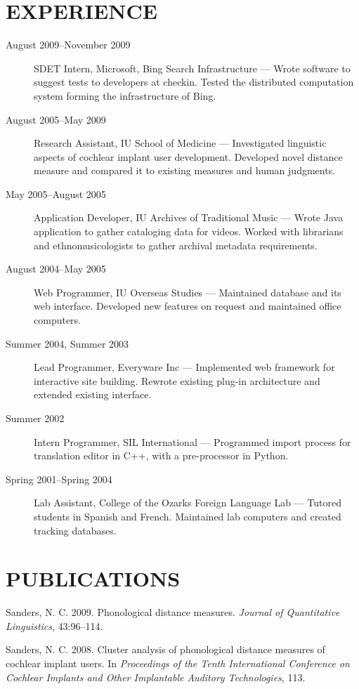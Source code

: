 \section*{EXPERIENCE}
\begin{description}
\item[August 2009--November 2009]
  SDET Intern, Microsoft, Bing Search Infrastructure --- Wrote
  software to suggest tests to developers at checkin. Tested
  the distributed computation system forming the infrastructure of
  Bing.
\item[August 2005--May 2009]
  Research Assistant, IU School of Medicine --- Investigated linguistic
  aspects of cochlear implant user development. Developed novel distance
  measure and compared it to existing measures and human judgments.
\item[May 2005--August 2005]
  Application Developer, IU Archives of Traditional Music --- Wrote Java
  application to gather cataloging data for videos. Worked with librarians and
  ethnomusicologists to gather archival metadata requirements.
\item[August 2004--May 2005]
  Web Programmer, IU Overseas Studies --- Maintained database and its
  web interface. Developed new features on request and maintained
  office computers.
\item[Summer 2004, Summer 2003]
  Lead Programmer, Everyware Inc --- Implemented web framework
  for interactive site building. Rewrote existing plug-in
  architecture and extended existing interface.
\item[Summer 2002]
  Intern Programmer, SIL International --- Programmed import
  process for translation editor in C++, with a pre-processor in Python.
\item[Spring 2001--Spring 2004]
  Lab Assistant, College of the Ozarks Foreign Language Lab ---
  Tutored students in Spanish and French. Maintained lab
  computers and created tracking databases.
\end{description}
\section*{PUBLICATIONS}

\indent\indent Sanders, N. C. 2009. Phonological distance measures. \emph{Journal
    of Quantitative Linguistics}, 43:96--114.

  Sanders, N. C. 2008. Cluster analysis of phonological distance
  measures of cochlear implant users. In \emph{Proceedings of the
    Tenth International Conference on Cochlear Implants and Other
    Implantable Auditory Technologies}, 113.

